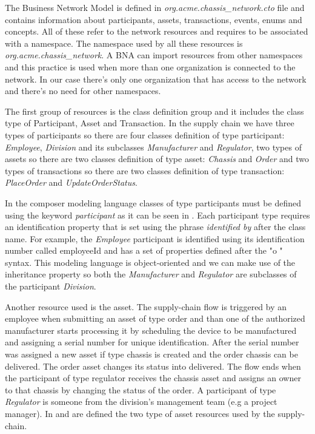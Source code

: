 
The Business Network Model is defined in \emph{org.acme.chassis_network.cto} file and contains information about participants, assets, transactions, events, enums and concepts. All of these refer to the network resources and requires to be associated with a namespace. The namespace used by all these resources is \emph{org.acme.chassis_network}. A BNA can import resources from other namespaces and this practice is used when more than one organization is connected to the network. In our case there's only one organization that has access to the network and there's no need for other namespaces.

The first group of resources is the class definition group and it includes the class type of Participant, Asset and Transaction. In the supply chain we have three types of participants so there are four classes definition of type participant: \emph{Employee}, \emph{Division} and its subclasses \emph{Manufacturer} and \emph{Regulator}, two types of assets so there are two classes definition of type asset: \emph{Chassis} and \emph{Order} and two types of transactions so there are two classes definition of type transaction: \emph{PlaceOrder} and \emph{UpdateOrderStatus}. 

In the composer modeling language classes of type participants must be defined using the keyword \emph{participant} as it can be seen in . Each participant type requires an identification property that is set using the phrase \emph{identified by} after the class name. For example, the \emph{Employee} participant is identified using its identification number called employeeId and has a set of properties defined after the "o " syntax. This modeling language is object-oriented and we can make use of the inheritance property so both the \emph{Manufacturer} and \emph{Regulator} are subclasses of the participant \emph{Division}.


Another resource used is the asset. The supply-chain flow is triggered by an employee when submitting an asset of type order and than one of the authorized manufacturer starts processing it by scheduling the device to be manufactured and assigning a serial number for unique identification. After the serial number was assigned a new asset if type chassis is created and the order chassis can be delivered. The order asset changes its status into delivered.
The flow ends when the participant of type regulator receives the chassis asset and assigns an owner to that chassis by changing the status of the order. A participant of type \emph{Regulator} is someone from the division's management team (e.g a project manager).
In  and  are defined the two type of asset resources used by the supply-chain. 

